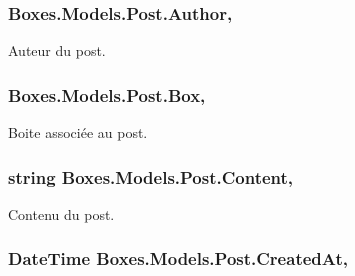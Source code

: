 \subsubsection[{\texorpdfstring{Author}{Author}}]{ Boxes.\+Models.\+Post.\+Author\hspace{0.3cm}{\ttfamily [get]}, {\ttfamily [set]}}\hypertarget{class_boxes_1_1_models_1_1_post_a9a761c3ae677e43965d50b54221a05c2}{}\label{class_boxes_1_1_models_1_1_post_a9a761c3ae677e43965d50b54221a05c2}


Auteur du post. 

\subsubsection[{\texorpdfstring{Box}{Box}}]{ Boxes.\+Models.\+Post.\+Box\hspace{0.3cm}{\ttfamily [get]}, {\ttfamily [set]}}\hypertarget{class_boxes_1_1_models_1_1_post_aeebf5eb456aa4537f3faf9ea1fb4bdda}{}\label{class_boxes_1_1_models_1_1_post_aeebf5eb456aa4537f3faf9ea1fb4bdda}


Boite associée au post. 

\subsubsection[{\texorpdfstring{Content}{Content}}]{\setlength{\rightskip}{0pt plus 5cm}string Boxes.\+Models.\+Post.\+Content\hspace{0.3cm}{\ttfamily [get]}, {\ttfamily [set]}}\hypertarget{class_boxes_1_1_models_1_1_post_ad19bad744f2fbfb06a350786d743612c}{}\label{class_boxes_1_1_models_1_1_post_ad19bad744f2fbfb06a350786d743612c}


Contenu du post. 

\subsubsection[{\texorpdfstring{Created\+At}{CreatedAt}}]{\setlength{\rightskip}{0pt plus 5cm}Date\+Time Boxes.\+Models.\+Post.\+Created\+At\hspace{0.3cm}{\ttfamily [get]}, {\ttfamily [set]}}\hypertarget{class_boxes_1_1_models_1_1_post_ac0000703bb1d9bfeb5aeab59038529ab}{}\label{class_boxes_1_1_models_1_1_post_ac0000703bb1d9bfeb5aeab59038529ab}


